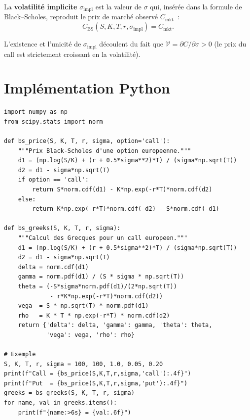 \begin{definition}
La \textbf{volatilit\'e implicite} $\sigma_{\text{impl}}$ est la valeur
de $\sigma$ qui, ins\'er\'ee dans la formule de Black--Scholes, reproduit
le prix de march\'e observ\'e $C_{\text{mkt}}$~:
\[
    C_{\text{BS}}(S, K, T, r, \sigma_{\text{impl}}) = C_{\text{mkt}}.
\]
\end{definition}

\begin{remarque}
L'existence et l'unicit\'e de $\sigma_{\text{impl}}$ d\'ecoulent du fait
que $\mathcal{V} = \partial C/\partial\sigma > 0$ (le prix du call est
strictement croissant en la volatilit\'e).
\end{remarque}

\section{Impl\'ementation Python}

\begin{codeblock}[title=\textbf{Formules de Black--Scholes et Grecques}]
\begin{verbatim}
import numpy as np
from scipy.stats import norm

def bs_price(S, K, T, r, sigma, option='call'):
    """Prix Black-Scholes d'une option europeenne."""
    d1 = (np.log(S/K) + (r + 0.5*sigma**2)*T) / (sigma*np.sqrt(T))
    d2 = d1 - sigma*np.sqrt(T)
    if option == 'call':
        return S*norm.cdf(d1) - K*np.exp(-r*T)*norm.cdf(d2)
    else:
        return K*np.exp(-r*T)*norm.cdf(-d2) - S*norm.cdf(-d1)

def bs_greeks(S, K, T, r, sigma):
    """Calcul des Grecques pour un call europeen."""
    d1 = (np.log(S/K) + (r + 0.5*sigma**2)*T) / (sigma*np.sqrt(T))
    d2 = d1 - sigma*np.sqrt(T)
    delta = norm.cdf(d1)
    gamma = norm.pdf(d1) / (S * sigma * np.sqrt(T))
    theta = (-S*sigma*norm.pdf(d1)/(2*np.sqrt(T))
             - r*K*np.exp(-r*T)*norm.cdf(d2))
    vega  = S * np.sqrt(T) * norm.pdf(d1)
    rho   = K * T * np.exp(-r*T) * norm.cdf(d2)
    return {'delta': delta, 'gamma': gamma, 'theta': theta,
            'vega': vega, 'rho': rho}

# Exemple
S, K, T, r, sigma = 100, 100, 1.0, 0.05, 0.20
print(f"Call = {bs_price(S,K,T,r,sigma,'call'):.4f}")
print(f"Put  = {bs_price(S,K,T,r,sigma,'put'):.4f}")
greeks = bs_greeks(S, K, T, r, sigma)
for name, val in greeks.items():
    print(f"{name:>6s} = {val:.6f}")
\end{verbatim}
\end{codeblock}

